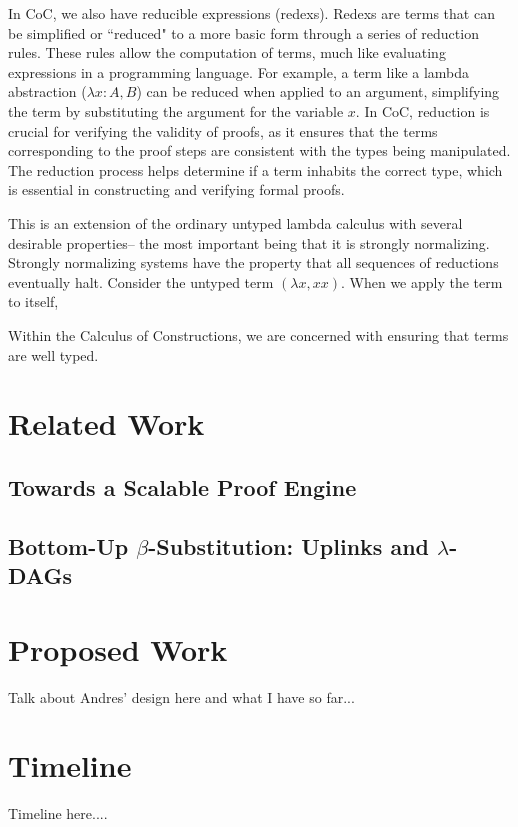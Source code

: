 \documentclass[12pt]{extarticle}
\begin{document}
	In CoC, we also have reducible expressions (redexs). Redexs are terms that can be simplified or ``reduced" to a more basic form through a series of reduction rules. These rules allow the computation of terms, much like evaluating expressions in a programming language. For example, a term like a lambda abstraction ($\lambda x: A, B$) can be reduced when applied to an argument, simplifying the term by substituting the argument for the variable $x$. In CoC, reduction is crucial for verifying the validity of proofs, as it ensures that the terms corresponding to the proof steps are consistent with the types being manipulated. The reduction process helps determine if a term inhabits the correct type, which is essential in constructing and verifying formal proofs.








	This is an extension of the ordinary untyped lambda calculus with several desirable properties-- the most important being that it is strongly normalizing. Strongly normalizing systems have the property that all sequences of reductions eventually halt. Consider the untyped term $(\lambda x, x x)$. When we apply the term to itself, 

	Within the Calculus of Constructions, we are concerned with ensuring that terms are well typed. 



\section{Related Work}
	\subsection{Towards a Scalable Proof Engine}

	\subsection{Bottom-Up $\beta$-Substitution: Uplinks and $\lambda$-DAGs}

\section{Proposed Work}
	Talk about Andres' design here and what I have so far...

\section{Timeline}

	Timeline here....
\end{document}
